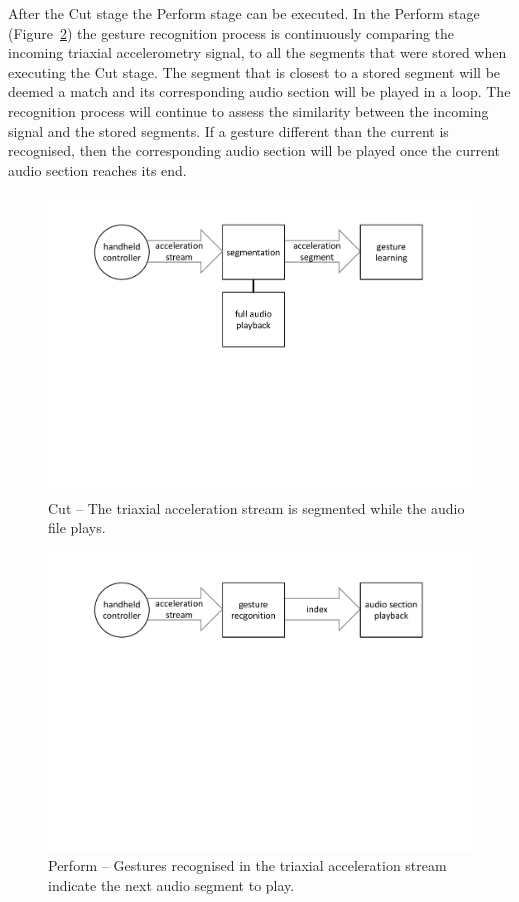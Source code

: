 \documentclass{nime-alternate_MANUSCRIPT} %
\begin{document}
After the Cut stage the Perform stage can be executed. In the Perform stage (Figure~\ref{fig_4}) the gesture recognition process is continuously comparing the incoming triaxial accelerometry signal, to all the segments that were stored when executing the Cut stage. The segment that is closest to a stored segment will be deemed a match and its corresponding audio section will be played in a loop. The recognition process will continue to assess the similarity between the incoming signal and the stored segments. If a gesture different than the current is recognised, then the corresponding audio section will be played once the current audio section reaches its end. 

\begin{figure}[t!]
	\centering
		\includegraphics[trim={3.2cm 10.2cm 3.2cm 2.1cm}, clip=true, width=1\columnwidth]{cut}
	\caption{Cut -- The triaxial acceleration stream is segmented while the audio file plays.}
	\label{fig_3}
\end{figure}

\begin{figure}[t!]
\vspace{1cm}
	\centering
		\includegraphics[trim={3.2cm 14.9cm 3.2cm 2.1cm}, clip=true, width=1\columnwidth]{perform}
	\caption{Perform -- Gestures recognised in the triaxial acceleration stream indicate the next audio segment to play.}
	\label{fig_4}
\end{figure}
\end{document}
